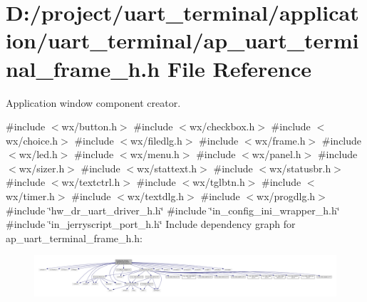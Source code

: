 \section{D\+:/project/uart\+\_\+terminal/application/uart\+\_\+terminal/ap\+\_\+uart\+\_\+terminal\+\_\+frame\+\_\+h.h File Reference}
\label{ap__uart__terminal__frame__h_8h}


Application window component creator.  


{\ttfamily \#include $<$wx/button.\+h$>$}\newline
{\ttfamily \#include $<$wx/checkbox.\+h$>$}\newline
{\ttfamily \#include $<$wx/choice.\+h$>$}\newline
{\ttfamily \#include $<$wx/filedlg.\+h$>$}\newline
{\ttfamily \#include $<$wx/frame.\+h$>$}\newline
{\ttfamily \#include $<$wx/led.\+h$>$}\newline
{\ttfamily \#include $<$wx/menu.\+h$>$}\newline
{\ttfamily \#include $<$wx/panel.\+h$>$}\newline
{\ttfamily \#include $<$wx/sizer.\+h$>$}\newline
{\ttfamily \#include $<$wx/stattext.\+h$>$}\newline
{\ttfamily \#include $<$wx/statusbr.\+h$>$}\newline
{\ttfamily \#include $<$wx/textctrl.\+h$>$}\newline
{\ttfamily \#include $<$wx/tglbtn.\+h$>$}\newline
{\ttfamily \#include $<$wx/timer.\+h$>$}\newline
{\ttfamily \#include $<$wx/textdlg.\+h$>$}\newline
{\ttfamily \#include $<$wx/progdlg.\+h$>$}\newline
{\ttfamily \#include \char`\"{}hw\+\_\+dr\+\_\+uart\+\_\+driver\+\_\+h.\+h\char`\"{}}\newline
{\ttfamily \#include \char`\"{}in\+\_\+config\+\_\+ini\+\_\+wrapper\+\_\+h.\+h\char`\"{}}\newline
{\ttfamily \#include \char`\"{}in\+\_\+jerryscript\+\_\+port\+\_\+h.\+h\char`\"{}}\newline
Include dependency graph for ap\+\_\+uart\+\_\+terminal\+\_\+frame\+\_\+h.\+h\+:\nopagebreak
\begin{figure}[H]
\begin{center}
\leavevmode
\includegraphics[width=350pt]{ap__uart__terminal__frame__h_8h__incl}
\end{center}
\end{figure}
